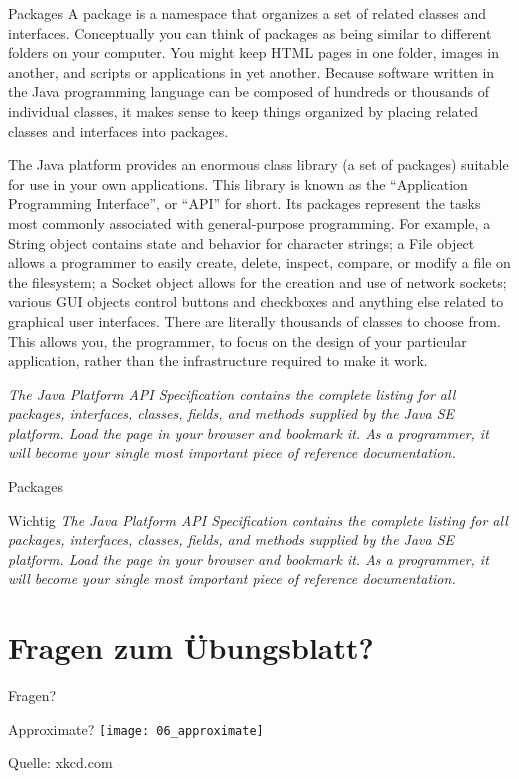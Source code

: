 \documentclass[18pt]{beamer}
\begin{document}
\begin{frame}{Packages}
\scriptsize
A package is a namespace that organizes a set of related classes and interfaces. 
Conceptually you can think of packages as being similar to different folders on your computer. 
You might keep HTML pages in one folder, images in another, and scripts or applications in yet another. 
Because software written in the Java programming language can be composed of hundreds or thousands of 
individual classes, it makes sense to keep things organized by placing related classes and interfaces into packages.

The Java platform provides an enormous class library (a set of packages) suitable for use in your own 
applications. This library is known as the ``Application Programming Interface'', or ``API'' for short. 
Its packages represent the tasks most commonly associated with general-purpose programming. For example, 
a String object contains state and behavior for character strings; a File object allows a programmer to easily 
create, delete, inspect, compare, or modify a file on the filesystem; a Socket object allows for the creation
and use of network sockets; various GUI objects control buttons and checkboxes and anything else related to 
graphical user interfaces. There are literally thousands of classes to choose from. This allows you, the programmer, 
to focus on the design of your particular application, rather than the infrastructure required to make it work.

\emph{The Java Platform API Specification contains the complete listing for all packages, interfaces, classes, fields, 
and methods supplied by the Java SE platform. Load the page in your browser and bookmark it. As a programmer, 
it will become your single most important piece of reference documentation.}

\end{frame}

\begin{frame}{Packages}
\begin{alertblock}{Wichtig}
\Large
\emph{The Java Platform API Specification contains the complete listing for all packages, interfaces, classes, fields, 
and methods supplied by the Java SE platform. Load the page in your browser and bookmark it. As a programmer, 
it will become your single most important piece of reference documentation.}
 
\end{alertblock}

\end{frame}

\section{Fragen zum Übungsblatt?}
\begin{frame}{Fragen?}
\end{frame}



\begin{frame}{Approximate?}
 \texttt{[image: 06\_approximate]}
 
 \tiny{Quelle: xkcd.com}
\end{frame}
\end{document}
